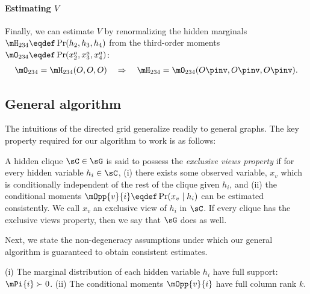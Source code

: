 \paragraph{Estimating $V$}
Finally, we can estimate $V$ by renormalizing the hidden marginals
$\mH_{234} \eqdef \Pr(h_2, h_3, h_4)$ from the third-order moments
$\mO_{234} \eqdef \Pr(x^a_2, x^a_3, x^a_4)$:
\begin{align*}
  \mO_{234} = \mH_{234}(O, O, O) \quad\Rightarrow\quad
  \mH_{234} = \mO_{234}(O\pinv , O\pinv , O\pinv ).
\end{align*}

\subsection{General algorithm}
\label{sec:directedGeneral}

The intuitions of the directed grid generalize readily to general graphs.
The key property required for our algorithm to work is as follows:
\begin{property}
  \label{prop:exclusive-views}
A hidden clique $\sC \in \sG$ is said to possess the \emph{exclusive views property} if for
  every hidden variable $h_i \in \sC$, (i)
  there exists some observed variable,
  $x_{v}$ which is conditionally independent of the rest of the clique
  given $h_i$, and (ii) the conditional moments $\mOpp{v}{i} \eqdef
  \Pr(x_{v} \mid h_i)$ can be estimated consistently.
We call $x_v$ an exclusive view of $h_i$ in $\sC$.
If every clique has the exclusive views property, then we say that $\sG$ does as well.
\end{property}

Next, we state the non-degeneracy assumptions under which our general
  algorithm is guaranteed to obtain consistent estimates.
\begin{assumption}
  \label{asm:non-degeneracy}
  (i) The marginal distribution of each hidden variable $h_i$ have
  full support: $\mPi{i} \succ 0$. 
  (ii) The conditional moments $\mOpp{v}{i}$ have full column rank $k$.
\end{assumption}


